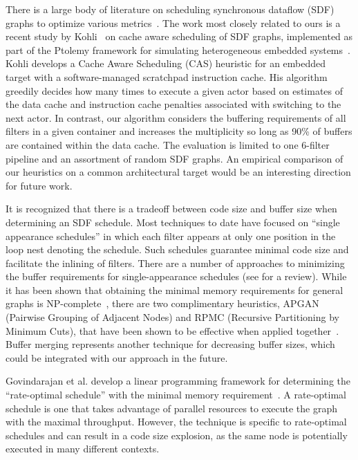There is a large body of literature on scheduling synchronous dataflow
(SDF) graphs to optimize various
metrics~\cite{bhattacharyya99synthesis,leesdf}.  The work most closely
related to ours is a recent study by Kohli~\cite{kohli04} on cache
aware scheduling of SDF graphs, implemented as part of the Ptolemy
framework for simulating heterogeneous embedded
systems~\cite{ptolemy03overview}.  Kohli develops a Cache Aware
Scheduling (CAS) heuristic for an embedded target with a
software-managed scratchpad instruction cache.  His algorithm greedily
decides how many times to execute a given actor based on estimates of
the data cache and instruction cache penalties associated with
switching to the next actor.  In contrast, our algorithm considers the
buffering requirements of all filters in a given container and
increases the multiplicity so long as 90\% of buffers are contained
within the data cache.  
The evaluation is limited to one 6-filter pipeline and an assortment
of random SDF graphs.  An empirical comparison of our heuristics on a
common architectural target would be an interesting direction for
future work.

It is recognized that there is a tradeoff between code size and buffer
size when determining an SDF schedule.  Most techniques to date have
focused on ``single appearance schedules'' in which each filter
appears at only one position in the loop nest denoting the schedule.
Such schedules guarantee minimal code size and facilitate the inlining
of filters.  There are a number of approaches to minimizing the buffer
requirements for single-appearance schedules (see
\cite{bhattacharyya99synthesis} for a review).  While it has been
shown that obtaining the minimal memory requirements for general
graphs is NP-complete~\cite{Bhatta97}, there are two complimentary
heuristics, APGAN (Pairwise Grouping of Adjacent Nodes) and RPMC
(Recursive Partitioning by Minimum Cuts), that have been shown to be
effective when applied together~\cite{Bhatta97}.  Buffer
merging\cite{murt1999x3,murt2000x2} represents another technique for
decreasing buffer sizes, which could be integrated with our approach
in the future.

Govindarajan et al. develop a linear programming framework for
determining the ``rate-optimal schedule'' with the minimal memory
requirement~\cite{GGD94}.  A rate-optimal schedule is one that takes
advantage of parallel resources to execute the graph with the maximal
throughput.  However, the technique is specific to rate-optimal
schedules and can result in a code size explosion, as the same node
is potentially executed in many different contexts.

